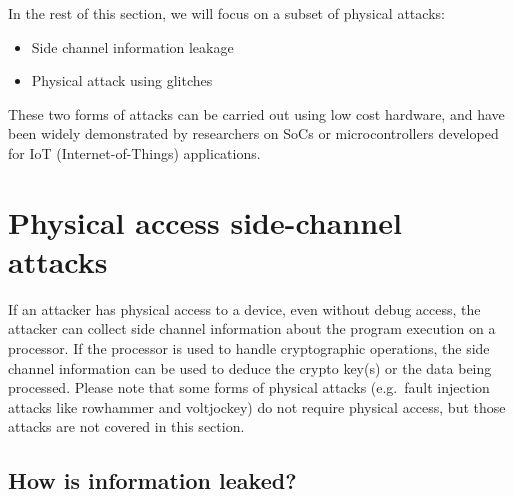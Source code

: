 \documentclass[a4paper,]{report}
\providecommand{\tightlist}{%
  \setlength{\itemsep}{0pt}\setlength{\parskip}{0pt}}
\begin{document}
In the rest of this section, we will focus on a subset of physical
attacks:

\begin{itemize}
\tightlist
\item
  Side channel information leakage
\item
  Physical attack using glitches
\end{itemize}

These two forms of attacks can be carried out using low cost hardware,
and have been widely demonstrated by researchers on SoCs or
microcontrollers developed for IoT (Internet-of-Things) applications.

\hypertarget{physical-access-side-channel-attacks-1}{%
\section{Physical access side-channel
attacks}\label{physical-access-side-channel-attacks-1}}

If an attacker has physical access to a device, even without debug
access, the attacker can collect side channel information about the
program execution on a processor. If the processor is used to handle
cryptographic operations, the side channel information can be used to
deduce the crypto key(s) or the data being processed. Please note that
some forms of physical attacks (e.g.~fault injection attacks like
rowhammer and voltjockey) do not require physical access, but those
attacks are not covered in this section.

\hypertarget{how-is-information-leaked}{%
\subsection{How is information
leaked?}\label{how-is-information-leaked}}
\end{document}
